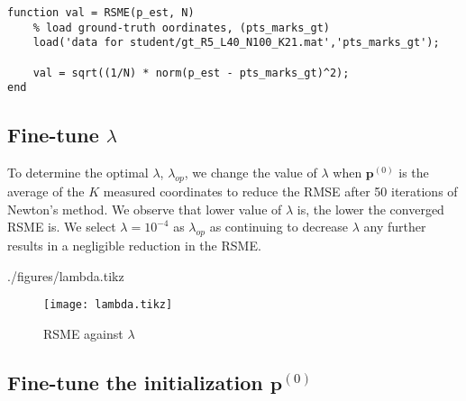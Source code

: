 \documentclass[12pt]{article}
\begin{document}
\begin{lstlisting}[style=Matlab-editor, caption={MATLAB Implementation of RSME}, label={list:rsme}]
function val = RSME(p_est, N)
    % load ground-truth oordinates, (pts_marks_gt)
    load('data for student/gt_R5_L40_N100_K21.mat','pts_marks_gt');

    val = sqrt((1/N) * norm(p_est - pts_marks_gt)^2);
end
\end{lstlisting}

\subsection*{Fine-tune $\lambda$}
To determine the optimal $\lambda$, $\lambda_{op}$, we change the value of $\lambda$ when $\mathbf{p}^{(0)}$ is the average of the $K$ measured coordinates to reduce the RMSE after 50 iterations of Newton's method. We observe that lower value of $\lambda$ is, the lower the converged RSME is. We select $\lambda = 10^{-4}$ as $\lambda_{op}$ as continuing to decrease $\lambda$ any further results in a negligible reduction in the RSME.

\begin{filecontents}[overwrite]{./figures/lambda.tikz}
\end{filecontents}

\begin{figure}[htp]
    \centering
    \caption{RSME against $\lambda$}
    \label{fig:lambda}
    \texttt{[image: lambda.tikz]}
\end{figure}

\subsection*{Fine-tune the initialization $\mathbf{p}^{(0)}$}
\end{document}
